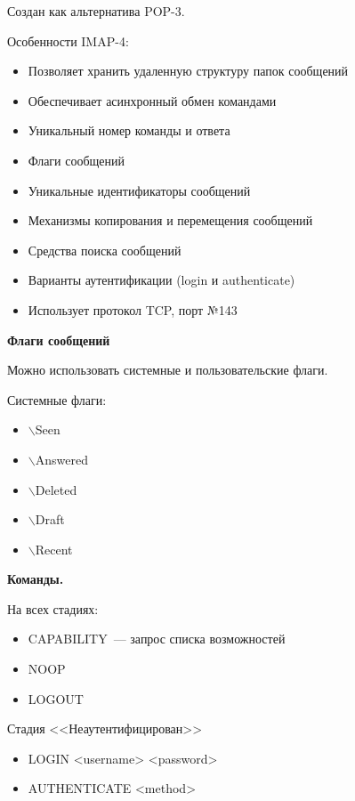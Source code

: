
Создан как альтернатива POP-3.

Особенности IMAP-4:
\begin{itemize}
    \item Позволяет хранить удаленную структуру папок сообщений
    \item Обеспечивает асинхронный обмен командами
    \item Уникальный номер команды и ответа
    \item Флаги сообщений
    \item Уникальные идентификаторы сообщений
    \item Механизмы копирования и перемещения сообщений
    \item Средства поиска сообщений
    \item Варианты аутентификации (login и authenticate)
    \item Использует протокол TCP, порт №143
\end{itemize}

{\bf Флаги сообщений}

Можно использовать системные и пользовательские флаги.

Системные флаги:
\begin{itemize}
    \item $\backslash$Seen
    \item $\backslash$Answered
    \item $\backslash$Deleted
    \item $\backslash$Draft
    \item $\backslash$Recent
\end{itemize}

{\bf Команды.}

На всех стадиях:
\begin{itemize}
    \item CAPABILITY~--- запрос списка возможностей
    \item NOOP
    \item LOGOUT
\end{itemize}

Стадия <<Неаутентифицирован>>
\begin{itemize}
    \item LOGIN <username> <password>
    \item AUTHENTICATE <method>
\end{itemize}

